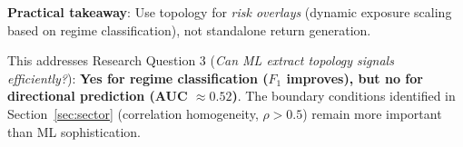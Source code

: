 \textbf{Practical takeaway}: Use topology for \textit{risk overlays} (dynamic exposure scaling based on regime classification), not standalone return generation.

This addresses Research Question 3 (\textit{Can ML extract topology signals efficiently?}): \textbf{Yes for regime classification ($F_1$ improves), but no for directional prediction (AUC $\approx 0.52$)}. The boundary conditions identified in Section~\ref{sec:sector} (correlation homogeneity, $\rho > 0.5$) remain more important than ML sophistication.
